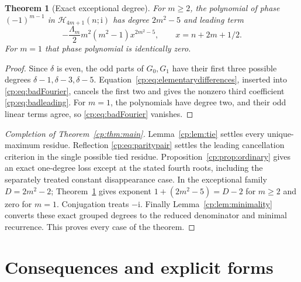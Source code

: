 \documentclass[11pt]{article}
\newtheorem{theorem}{Theorem}[section]
\theoremstyle{definition}
\theoremstyle{remark}
\newcommand{\Ht}{\mathcal H}
\newcommand{\ii}{\mathrm i}
\theoremstyle{definition}
\theoremstyle{plain}
\numberwithin{equation}{section}
\begin{document}
\begin{theorem}[Exact exceptional degree]
\label{cp:thm:triple}
For $m\ge2$, the polynomial of phase $(-1)^{m-1}$ in
$\Ht_{4m+1}(n;\ii)$ has degree $2m^2-5$ and leading term
\begin{equation}
 -\frac{\Lambda_m}{2}m^2(m^2-1)x^{2m^2-5},
 \qquad x=n+2m+1/2.
 \label{cp:eq:badleading}
\end{equation}
For $m=1$ that phase polynomial is identically zero.
\end{theorem}
\begin{proof}
Since $\delta$ is even, the odd parts of $G_0,G_1$ have their first three
possible degrees $\delta-1,\delta-3,\delta-5$.
Equation~\eqref{cp:eq:elementarydifferences}, inserted into
\eqref{cp:eq:badFourier}, cancels the first two and gives the nonzero third
coefficient \eqref{cp:eq:badleading}. For $m=1$, the polynomials have degree
two, and their odd linear terms agree, so \eqref{cp:eq:badFourier} vanishes.
\end{proof}

\begin{proof}[Completion of Theorem~\ref{cp:thm:main}]
Lemma~\ref{cp:lem:tie} settles every unique-maximum residue. Reflection
\eqref{cp:eq:paritypair} settles the leading cancellation criterion in the
single possible tied residue. Proposition~\ref{cp:prop:ordinary} gives an
exact one-degree loss except at the stated fourth roots, including the
separately treated constant disappearance case.
In the exceptional family $D=2m^2-2$; Theorem~\ref{cp:thm:triple} gives
exponent $1+(2m^2-5)=D-2$ for $m\ge2$ and zero for $m=1$.
Conjugation treats $-\ii$. Finally Lemma~\ref{cp:lem:minimality} converts
these exact grouped degrees to the reduced denominator and minimal
recurrence. This proves every case of the theorem.
\end{proof}

\section{Consequences and explicit forms}
\label{cp:sec:consequences}
\end{document}

